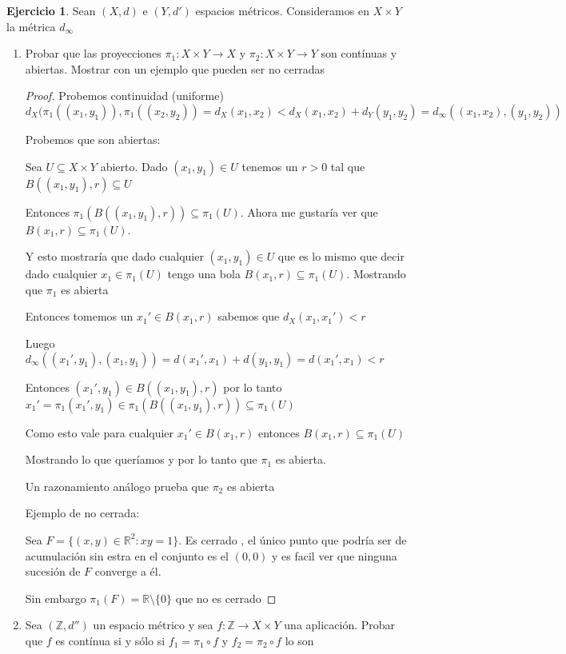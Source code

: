 \documentclass[11pt]{report}
\newcommand{\R}{\mathbb{R}}
\newcommand{\Z}{\mathbb{Z}}
\newcommand{\ra}{\rightarrow}
\theoremstyle{definition}
\newtheorem{ej}{Ejercicio}
\begin{document}
	\begin{ej}
		Sean $(X,d)$ e $(Y,d')$ espacios métricos. Consideramos en $X \times Y$ la métrica $d_{\infty}$
		\begin{enumerate}
			\item Probar que las proyecciones $\pi_1 : X \times Y \ra X$ y $\pi_2 : X \times Y \ra Y$ son contínuas y abiertas. Mostrar con un ejemplo que pueden ser no cerradas
				\begin{proof}
					Probemos continuidad (uniforme) 
					$$d_X(\pi_1((x_1,y_1)),\pi_1((x_2,y_2)) = d_X(x_1,x_2) < d_X(x_1,x_2) + d_Y(y_1,y_2) = d_{\infty}((x_1,x_2),(y_1,y_2)) $$		

					Probemos que son abiertas:

					Sea $U \subseteq X \times Y$ abierto. Dado $(x_1,y_1) \in U$ tenemos un $r>0$ tal que $B((x_1,y_1),r) \subseteq U$

					Entonces $\pi_1(B((x_1,y_1),r)) \subseteq \pi_1(U)$. Ahora me gustaría ver que $B(x_1,r) \subseteq \pi_1(U)$. 

					Y esto mostraría que dado cualquier $(x_1,y_1) \in U$ que es lo mismo que decir dado cualquier $x_1 \in \pi_1(U)$ tengo una bola $B(x_1,r) \subseteq \pi_1(U)$. Mostrando que $\pi_1$ es abierta

					Entonces tomemos un $x_1' \in B(x_1,r)$ sabemos que $d_X(x_1,x_1') < r $

					Luego $d_{\infty}((x_1',y_1),(x_1,y_1)) = d(x_1', x_1) + d(y_1,y_1) = d(x_1',x_1) < r$

					Entonces $(x_1',y_1) \in B((x_1,y_1),r)$ por lo tanto $x_1'= \pi_1(x_1',y_1) \in \pi_1(B((x_1,y_1),r)) \subseteq \pi_1(U)$

					Como esto vale para cualquier $x_1'\in B(x_1,r)$ entonces $B(x_1,r) \subseteq \pi_1(U)$

					Mostrando lo que queríamos y por lo tanto que $\pi_1$ es abierta. 

					Un razonamiento análogo prueba que $\pi_2$ es abierta

					Ejemplo de no cerrada:

					Sea $F = \{(x,y) \in \R^2 : xy = 1\}$. Es cerrado , el único punto que podría ser de acumulación sin estra en el conjunto es el $(0,0)$ y es facil ver que ninguna sucesión de $F$ converge a él.

					Sin embargo $\pi_1(F) = \R \setminus \{0\}$ que no es cerrado
				\end{proof}
			\item Sea $(\Z,d '')$ un espacio métrico y sea $f : \Z \ra X \times Y$ una aplicación. Probar que $f$ es contínua si y sólo si $f_1 = \pi_1 \circ f$ y $f_2 = \pi_2 \circ f$ lo son
				

\end{enumerate}
\end{ej}
\end{document}

